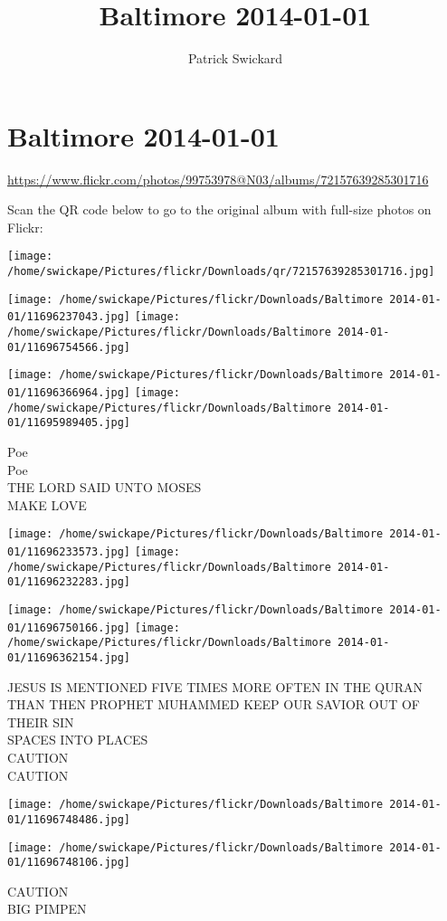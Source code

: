 \documentclass[10pt,letterpaper]{article}
\title{Baltimore 2014-01-01}
\author{Patrick Swickard}
\date{}
\begin{document}
\section*{Baltimore 2014-01-01}

\url{https://www.flickr.com/photos/99753978@N03/albums/72157639285301716}

Scan the QR code below to go to the original album with full-size photos on Flickr:

\texttt{[image: /home/swickape/Pictures/flickr/Downloads/qr/72157639285301716.jpg]}
\pagebreak

\texttt{[image: /home/swickape/Pictures/flickr/Downloads/Baltimore 2014-01-01/11696237043.jpg]}
\texttt{[image: /home/swickape/Pictures/flickr/Downloads/Baltimore 2014-01-01/11696754566.jpg]}

\texttt{[image: /home/swickape/Pictures/flickr/Downloads/Baltimore 2014-01-01/11696366964.jpg]}
\texttt{[image: /home/swickape/Pictures/flickr/Downloads/Baltimore 2014-01-01/11695989405.jpg]}

Poe\\
Poe\\
THE LORD SAID UNTO MOSES\\
MAKE LOVE
\pagebreak

\texttt{[image: /home/swickape/Pictures/flickr/Downloads/Baltimore 2014-01-01/11696233573.jpg]}
\texttt{[image: /home/swickape/Pictures/flickr/Downloads/Baltimore 2014-01-01/11696232283.jpg]}

\texttt{[image: /home/swickape/Pictures/flickr/Downloads/Baltimore 2014-01-01/11696750166.jpg]}
\texttt{[image: /home/swickape/Pictures/flickr/Downloads/Baltimore 2014-01-01/11696362154.jpg]}

JESUS IS MENTIONED FIVE TIMES MORE OFTEN IN THE QURAN THAN THEN PROPHET MUHAMMED KEEP OUR SAVIOR OUT OF THEIR SIN\\
SPACES INTO PLACES\\
CAUTION\\
CAUTION
\pagebreak

\texttt{[image: /home/swickape/Pictures/flickr/Downloads/Baltimore 2014-01-01/11696748486.jpg]}

\vspace{0.25in}
\texttt{[image: /home/swickape/Pictures/flickr/Downloads/Baltimore 2014-01-01/11696748106.jpg]}

CAUTION\\
BIG PIMPEN
\pagebreak
\end{document}
